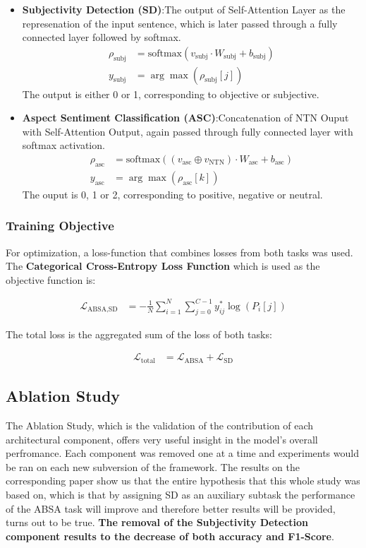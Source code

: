 \documentclass[a4paper,12pt]{article}
\begin{document}
\begin{itemize}
    \item \textbf{Subjectivity Detection (SD)}:The output of Self-Attention Layer as the represenation of the input sentence, which is later passed through a fully connected layer followed by softmax.
    \begin{align}
    \rho_{\text{subj}} &= \mathrm{softmax}\left(v_{\text{subj}} \cdot W_{\text{subj}} + b_{\text{subj}}\right) \\
    y_{\text{subj}} &= \arg\max\left(\rho_{\text{subj}}[j]\right)
    \end{align}
    The output is either 0 or 1, corresponding to objective or subjective.
    \item \textbf{Aspect Sentiment Classification (ASC)}:Concatenation of NTN Ouput with Self-Attention Output, again passed through fully connected layer with softmax activation.
    \begin{align}
    \rho_{\text{asc}} &= \mathrm{softmax}\left((v_{\text{asc}} \oplus v_{\text{NTN}}) \cdot W_{\text{asc}} + b_{\text{asc}}\right) \\
    y_{\text{asc}} &= \arg\max\left(\rho_{\text{asc}}[k]\right)
    \end{align}
    The ouput is 0, 1 or 2, corresponding to positive, negative or neutral.
\end{itemize}

\subsubsection{Training Objective}
For optimization, a loss-function that combines losses from both tasks was used. The \textbf{Categorical Cross-Entropy Loss Function} which is used as the objective function is:

\begin{align}
\mathcal{L}_{\text{ABSA,SD}} &= -\frac{1}{N} \sum_{i=1}^{N} \sum_{j=0}^{C-1} y_{ij}^{*} \log\left(P_i[j]\right)
\end{align}

The total loss is the aggregated sum of the loss of both tasks:

\begin{align}
\mathcal{L}_{\text{total}} &= \mathcal{L}_{\text{ABSA}} + \mathcal{L}_{\text{SD}}
\end{align}

\subsection{Ablation Study}
The Ablation Study, which is the validation of the contribution of each architectural component, offers very useful insight in the model's overall perfromance. Each component was removed one at a time and experiments
would be ran on each new subversion of the framework. The results on the corresponding paper show us that the entire hypothesis that this whole study was based on, which is that by assigning SD as an auxiliary subtask
the performance of the ABSA task will improve and therefore better results will be provided, turns out to be true. \textbf{The removal of the Subjectivity Detection component results to the decrease of both accuracy and F1-Score}.
\end{document}
